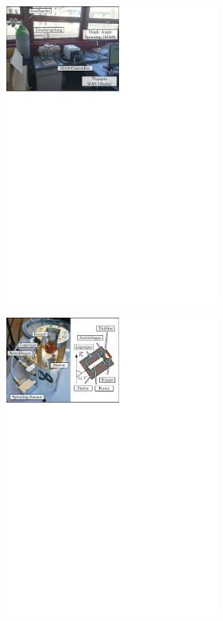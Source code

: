 \documentclass[a4paper]{article}
\newenvironment{Figure}
	{\par\medskip\noindent\minipage{\linewidth}}
	{\endminipage\par\medskip}
\begin{document}
\begin{multicols*}{2}
				
				\begin{Figure}
					\centering
					\includegraphics[trim={0cm 21.2cm 9.7cm 0},clip,width=7cm]{images/Device_2.pdf}
					\label{fig:device2}
					\vspace*{0.5mm}
				\end{Figure}
				
				\begin{Figure}
					\centering
					\includegraphics[trim={0cm 21.2cm 9.7cm 0},clip,width=7cm]{images/Device_3.pdf}
					\label{fig:device3}
					\vspace*{0.5mm}
				\end{Figure}
				

\end{multicols*}
\end{document}

